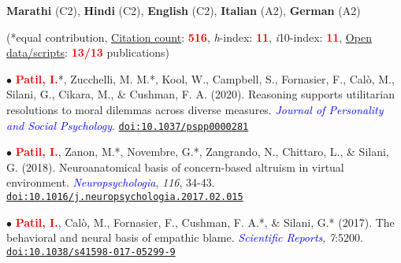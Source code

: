 \documentclass[10pt]{article}
\begin{document}
	

	\textbf{Marathi} (C2), \textbf{Hindi} (C2), \textbf{English} (C2), \textbf{Italian} (A2), \textbf{German} (A2)
	
	\begin{center}
	(*equal contribution, \href{https://scholar.google.it/citations?user=kSYuYTUAAAAJ&hl=en&oi=ao}{Citation count}: \textbf{\textcolor{red}{516}}, \textit{h}-index: \textbf{\textcolor{red}{11}}, \textit{i}10-index: \textbf{\textcolor{red}{11}}, \href{https://osf.io/hk5f3/}{Open data/scripts}: \textbf{\textcolor{red}{13/13}} publications)\\
	\end{center}

	$\bullet$ \textbf{\textcolor{red}{Patil, I.}}*, Zucchelli, M. M.*, Kool, W., Campbell, S., Fornasier, F., Cal\`{o}, M., Silani, G., Cikara, M., \& \hspace*{0.1in}Cushman, F. A. (2020). Reasoning supports utilitarian resolutions to moral dilemmas across diverse \hspace*{0.1in}measures. \textit{\textcolor{blue}{Journal of Personality and Social Psychology}}. \href{https://psyarxiv.com/q86vx/}{\tt doi:10.1037/pspp0000281}
	\miniskip
	
	$\bullet$ \textbf{\textcolor{red}{Patil, I.}}, Zanon, M.*, Novembre, G.*, Zangrando, N., Chittaro, L., \& Silani, G. (2018). Neuroanatomical \hspace*{0.1in}basis of concern-based altruism in virtual environment. \textit{\textcolor{blue}{Neuropsychologia}}, \textit{116}, 34-43. \hspace*{0.1in}\href{https://drive.google.com/open?id=0B6_u70YpdJKnWU0zblpBOUMxRXc}{\tt doi:10.1016/j.neuropsychologia.2017.02.015}
	\miniskip	
	
	$\bullet$ \textbf{\textcolor{red}{Patil, I.}}, Cal\`{o}, M., Fornasier, F., Cushman, F. A.*, \& Silani, G.* (2017). The behavioral and neural basis of \hspace*{0.1in}empathic blame. 
	\textit{\textcolor{blue}{Scientific Reports}}, \textit{7}:5200. \href{https://drive.google.com/open?id=0B6_u70YpdJKnT1J6dkk5R1NPZDg}{\tt doi:10.1038/s41598-017-05299-9}
	\miniskip
	
\end{document}
